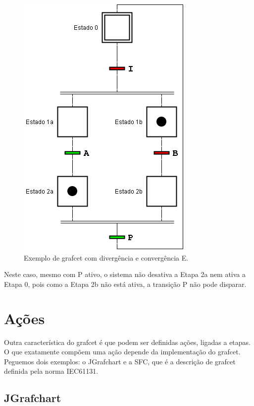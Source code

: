 \begin{figure}[hbt]
  \centering
  \includegraphics[scale=0.6]{figuras/grafcetdivE}
  \caption{Exemplo de grafcet com divergência e convergência E.}
  \label{fig:grafcetdivE}
\end{figure}

Neste caso, mesmo com P ativo, o sistema não desativa a Etapa 2a nem ativa a Etapa 0, pois como a Etapa 2b não está ativa, a transição P não pode disparar.

\section{Ações}
Outra característica do grafcet é que podem ser definidas ações, ligadas a etapas. O que exatamente compõem uma ação depende da implementação do grafcet. Peguemos dois exemplos: o JGrafchart e a SFC, que é a descrição de grafcet definida pela norma IEC61131.

\subsection{JGrafchart}
\label{sub:JGrafchart}

